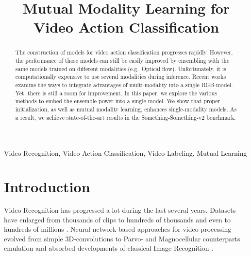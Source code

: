 \documentclass[conference]{IEEEtran}
\begin{document}
\title{Mutual Modality Learning for Video Action Classification}

\author{
}

\maketitle

\begin{abstract}
	
The construction of models for video action classification progresses rapidly. However, the performance of those models can still be easily improved by ensembling with the same models trained on different modalities (e.g.~Optical flow). Unfortunately, it is computationally expensive to use several modalities during inference. Recent works examine the ways to integrate advantages of multi-modality into a single RGB-model. Yet, there is still a room for improvement. In this paper, we explore the various methods to embed the ensemble power into a single model. We show that proper initialization, as well as mutual modality learning, enhances single-modality models. As a result, we achieve state-of-the-art results in the Something-Something-v2 benchmark.
\end{abstract}

\begin{IEEEkeywords}
Video Recognition, Video Action Classification, Video Labeling, Mutual Learning
\end{IEEEkeywords}

\section{Introduction}

Video Recognition has progressed a lot during the last several years. Datasets have enlarged from thousands of clips \cite{kuehne2011hmdb, soomro2012ucf101} to hundreds of thousands \cite{kay2017kinetics,carreira2019short,goyal2017something} and even to hundreds of millions \cite{miech2019howto100m}. Neural network-based approaches for video processing evolved from simple 3D-convolutions \cite{tran2015learning} to Parvo- and Magnocellular counterparts emulation \cite{feichtenhofer2019slowfast} and absorbed developments of classical Image Recognition \cite{carreira2017quo,lin2019tsm}. 
\end{document}
